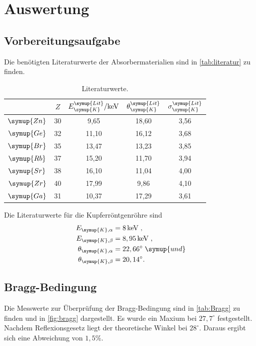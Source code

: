 \section{Auswertung}
\label{sec:Auswertung}

\subsection{Vorbereitungsaufgabe}
\label{sec:Vorbereitungsaufgabe}
Die benötigten Literaturwerte der Absorbermaterialien sind in \autoref{tab:literatur} zu finden.
\begin{table}
  \centering
  \caption{Literaturwerte.}
  \label{tab:literatur}
  \begin{tabular}{c | c c c c}
    \toprule
    & $Z$ & $E_{\symup{K}}^{\symup{Lit}}/\unit{\kilo\electronvolt}$ & $\theta_{\symup{K}}^{\symup{Lit}}$ & $\sigma_{\symup{K}}^{\symup{Lit}}$ \\
    \midrule
    $\symup{Zn}$  & 30 &  9,65 & 18,60 & 3,56 \\
    $\symup{Ge}$  & 32 & 11,10 & 16,12 & 3,68 \\
    $\symup{Br}$  & 35 & 13,47 & 13,23 & 3,85 \\
    $\symup{Rb}$  & 37 & 15,20 & 11,70 & 3,94 \\
    $\symup{Sr}$  & 38 & 16,10 & 11,04 & 4,00 \\
    $\symup{Zr}$  & 40 & 17,99 &  9,86 & 4,10 \\
    $\symup{Ga}$  & 31 & 10,37 & 17,29 & 3,61 \\
    \bottomrule
  \end{tabular}
\end{table}
Die Literaturwerte für die Kupferröntgenröhre sind
\begin{align*}
  E_{\symup{K}, \alpha} &= 8\,\unit{\kilo\eV}\;, \\
  E_{\symup{K}, \beta}  &= 8,95\,\unit{\kilo\eV}\;, \\
  \theta_{\symup{K}, \alpha} &= 22,66^{\circ}\; \symup{und} \\
  \theta_{\symup{K}, \beta} &= 20,14^{\circ}.
\end{align*}

\subsection{Bragg-Bedingung}
\label{sec:Bragg}

Die Messwerte zur Überprüfung der Bragg-Bedingung sind in \autoref{tab:Bragg} zu finden und in \autoref{fig:bragg}
dargestellt. Es wurde ein Maxium bei $27,7^{\circ}$ festgestellt. Nachdem Reflexionsgesetz liegt der
theoretische Winkel bei $28^{\circ}$. Daraus ergibt sich eine Abweichung von $1,5\%$.

